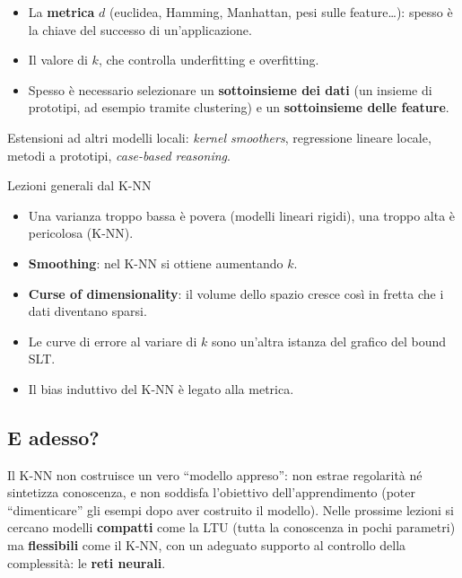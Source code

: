 \begin{itemize}
\tightlist
\item
  La \textbf{metrica} \(d\) (euclidea, Hamming, Manhattan, pesi sulle
  feature\ldots): spesso è la chiave del successo di un'applicazione.
\item
  Il valore di \textbf{\(k\)}, che controlla underfitting e overfitting.
\item
  Spesso è necessario selezionare un \textbf{sottoinsieme dei dati} (un
  insieme di prototipi, ad esempio tramite clustering) e un
  \textbf{sottoinsieme delle feature}.
\end{itemize}

Estensioni ad altri modelli locali: \emph{kernel smoothers}, regressione
lineare locale, metodi a prototipi, \emph{case-based reasoning}.

\begin{boxabstract}{Lezioni generali dal K-NN}

\begin{itemize}
\tightlist
\item
  Una varianza troppo bassa è povera (modelli lineari rigidi), una
  troppo alta è pericolosa (K-NN).
\item
  \textbf{Smoothing}: nel K-NN si ottiene aumentando \(k\).
\item
  \textbf{Curse of dimensionality}: il volume dello spazio cresce così
  in fretta che i dati diventano sparsi.
\item
  Le curve di errore al variare di \(k\) sono un'altra istanza del
  grafico del bound SLT.
\item
  Il bias induttivo del K-NN è legato alla metrica.
\end{itemize}

\end{boxabstract}

\subsection{E adesso?}\label{e-adesso}

Il K-NN non costruisce un vero ``modello appreso'': non estrae
regolarità né sintetizza conoscenza, e non soddisfa l'obiettivo
dell'apprendimento (poter ``dimenticare'' gli esempi dopo aver costruito
il modello). Nelle prossime lezioni si cercano modelli \textbf{compatti}
come la LTU (tutta la conoscenza in pochi parametri) ma
\textbf{flessibili} come il K-NN, con un adeguato supporto al controllo
della complessità: le \textbf{reti neurali}.

